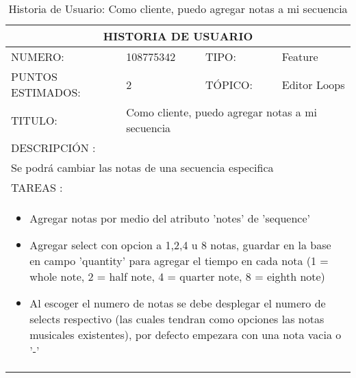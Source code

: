 \begin{table}[h]
\centering
\renewcommand{\arraystretch}{1.4}
\begin{tabular}{|*{4}{l|}}
\hline
\multicolumn{4}{|c|}{HISTORIA DE USUARIO} \\ \hline
NUMERO: & 108775342 & TIPO: & Feature \\ \hline
PUNTOS ESTIMADOS: & 2 & TÓPICO: & Editor Loops \\ \hline
TITULO: & \multicolumn{3}{|p{7.2cm}|}{Como cliente, puedo agregar notas a mi secuencia} \\ \hline
\multicolumn{4}{|l|}{DESCRIPCIÓN : } \\ \hline
\multicolumn{4}{|l|}{Se podrá cambiar las notas de una secuencia especifica} \\ \hline
\multicolumn{4}{|l|}{TAREAS : } \\ \hline
\multicolumn{4}{|p{11cm}|}{
\begin{minipage}[t]{\hsize}
  \begin{itemize}
    \item Agregar notas por medio del atributo 'notes' de 'sequence'
    \item Agregar select con opcion a 1,2,4 u 8 notas, guardar en la base en campo 'quantity' para agregar el tiempo en cada nota (1 = whole note, 2 = half note, 4 = quarter note, 8 = eighth note)
    \item Al escoger el numero de notas se debe desplegar el numero de selects respectivo (las cuales tendran como opciones las notas musicales existentes), por defecto empezara con una nota vacia o '-'
  \end{itemize}
\end{minipage}
} \\ \hline
\end{tabular}
\caption{Historia de Usuario: Como cliente, puedo agregar notas a mi secuencia}
\label{tab:Primero}
\end{table}

